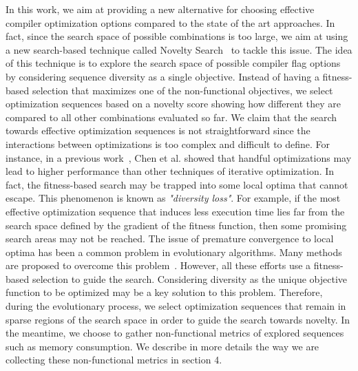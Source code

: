 In this work, we aim at providing a new alternative for choosing effective compiler optimization options compared to the state of the art approaches. 
In fact, since the search space of possible combinations is too large, we aim at using a new search-based technique called Novelty Search~\cite{lehman2008exploiting} to tackle this issue. 
The idea of this technique is to explore the search space of possible compiler flag options by considering sequence diversity as a single objective. 
Instead of having a fitness-based selection that maximizes one of the non-functional objectives, we select optimization sequences based on a novelty score showing how different they are compared to all other combinations evaluated so far. 
We claim that the search towards effective optimization sequences is not straightforward since the interactions between optimizations is too complex and difficult to define. 
For instance, in a previous work~\cite{chen2012deconstructing}, Chen et al. showed that handful optimizations may lead to higher performance than other techniques of iterative optimization. 
In fact, the fitness-based search may be trapped into some local optima that cannot escape. 
This phenomenon is known as \textit{"diversity loss"}. For example, if the most effective optimization sequence that induces less execution time lies far from the search space defined by the gradient of the fitness function, then some promising search areas may not be reached. 
The issue of premature convergence to local optima has been a common problem in evolutionary algorithms. 
Many methods are proposed to overcome this problem~\cite{banzhaf1996effect}. 
However, all these efforts use a fitness-based selection to guide the search. Considering diversity as the unique objective function to be optimized may be a key solution to this problem.
Therefore, during the evolutionary process, we select optimization sequences that remain in sparse regions of the search space in order to guide the search towards novelty. 
In the meantime, we choose to gather non-functional metrics of explored sequences such as memory consumption. 
We describe in more details the way we are collecting these non-functional metrics in section 4.

